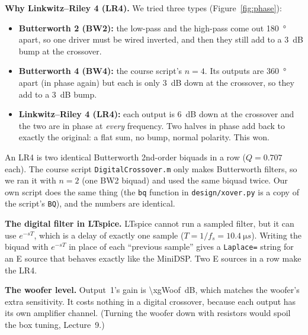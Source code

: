 \documentclass[a4paper,10pt]{article}
\newcommand{\file}[1]{\nolinkurl{#1}}
\begin{document}
\textbf{Why Linkwitz--Riley 4 (LR4).} We tried three types (Figure~\ref{fig:phase}):
\begin{itemize}
\item \textbf{Butterworth 2 (BW2):} the low-pass and the high-pass come out \SI{180}{\degree} apart,
  so one driver must be wired inverted, and then they still add to a \SI{3}{dB} bump at the crossover.
\item \textbf{Butterworth 4 (BW4):} the course script's $n = 4$. Its outputs are \SI{360}{\degree}
  apart (in phase again) but each is only \SI{3}{dB} down at the crossover, so they add to a
  \SI{3}{dB} bump.
\item \textbf{Linkwitz--Riley 4 (LR4):} each output is \SI{6}{dB} down at the crossover and the two are
  in phase at \emph{every} frequency. Two halves in phase add back to exactly the original: a flat
  sum, no bump, normal polarity. This won.
\end{itemize}
An LR4 is two identical Butterworth 2nd-order biquads in a row ($Q = 0.707$ each). The course script
\file{DigitalCrossover.m} only makes Butterworth filters, so we ran it with $n = 2$ (one BW2 biquad) and
used the same biquad twice. Our own script does the same thing (the \file{bq} function in
\file{design/xover.py} is a copy of the script's \file{BQ}), and the numbers are identical.

\textbf{The digital filter in LTspice.} LTspice cannot run a sampled filter, but it can use
$e^{-sT}$, which is a delay of exactly one sample ($T = 1/f_s = \SI{10.4}{\micro s}$). Writing the
biquad with $e^{-sT}$ in place of each ``previous sample'' gives a \file{Laplace=} string for an E
source that behaves exactly like the MiniDSP. Two E sources in a row make the LR4.

\textbf{The woofer level.} Output~1's gain is \SI{\xgWoof}{dB}, which matches the woofer's extra
sensitivity. It costs nothing in a digital crossover, because each output has its own amplifier
channel. (Turning the woofer down with resistors would spoil the box tuning, Lecture~9.)
\end{document}
